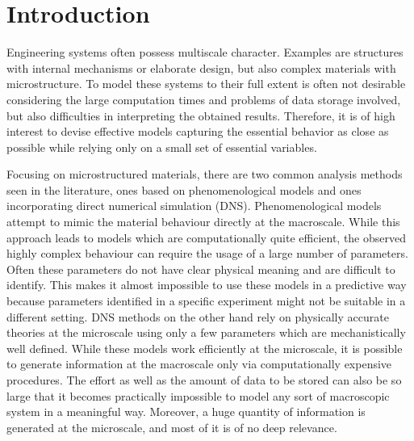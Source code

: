\documentclass[final,1p,times]{elsarticle}
\begin{document}
\section{Introduction}
\label{intro}

Engineering systems often possess multiscale character. Examples are structures with internal mechanisms or elaborate design, but also complex materials with microstructure. To model these systems to their full extent is often not desirable considering the large computation times and problems of data storage involved, but also difficulties in interpreting the obtained results. Therefore, it is of high interest to devise effective models capturing the essential behavior as close as possible while relying only on a small set of essential variables.

Focusing on microstructured materials, there are two common analysis methods seen in the literature, ones based on phenomenological models and ones incorporating direct numerical simulation (DNS).   Phenomenological models attempt to mimic the material behaviour directly at the {macroscale}. While this approach leads to models which are computationally quite efficient, the observed highly complex behaviour can require the usage of a {large number of parameters}. Often these parameters do not have clear physical meaning and are difficult to identify. This makes it almost {impossible to use these models in a predictive way} because parameters identified in a specific experiment might not be suitable in a different setting.
{DNS methods} on the other hand rely on {physically accurate theories at the microscale} using only a few parameters which are mechanistically well defined.   While these models work efficiently at the microscale, it is possible to generate information at the macroscale only via computationally expensive procedures. The effort as well as the amount of data to be stored can also be so large that it becomes practically {impossible to model any sort of macroscopic system} in a meaningful way. Moreover, a huge quantity of information is generated at the microscale, and most of it is of no deep relevance.
\end{document}
